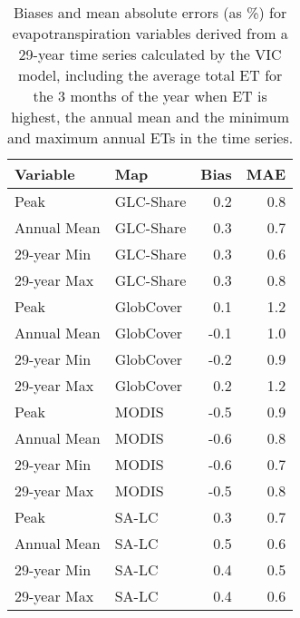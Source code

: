\begin{longtable}{llrr}
\caption{Biases and mean absolute errors (as \%) for evapotranspiration variables derived from a 29-year time series calculated by the VIC model, including the average total ET for the 3 months of the year when ET is highest, the annual mean and the minimum and maximum annual ETs in the time series.} \\ 
  \hline
Variable & Map & Bias & MAE \\ 
  \hline
Peak & GLC-Share & 0.2 & 0.8 \\ 
  Annual Mean & GLC-Share & 0.3 & 0.7 \\ 
  29-year Min & GLC-Share & 0.3 & 0.6 \\ 
  29-year Max & GLC-Share & 0.3 & 0.8 \\ 
  Peak & GlobCover & 0.1 & 1.2 \\ 
  Annual Mean & GlobCover & -0.1 & 1.0 \\ 
  29-year Min & GlobCover & -0.2 & 0.9 \\ 
  29-year Max & GlobCover & 0.2 & 1.2 \\ 
  Peak & MODIS & -0.5 & 0.9 \\ 
  Annual Mean & MODIS & -0.6 & 0.8 \\ 
  29-year Min & MODIS & -0.6 & 0.7 \\ 
  29-year Max & MODIS & -0.5 & 0.8 \\ 
  Peak & SA-LC & 0.3 & 0.7 \\ 
  Annual Mean & SA-LC & 0.5 & 0.6 \\ 
  29-year Min & SA-LC & 0.4 & 0.5 \\ 
  29-year Max & SA-LC & 0.4 & 0.6 \\ 
   \hline
\hline
\end{longtable}
